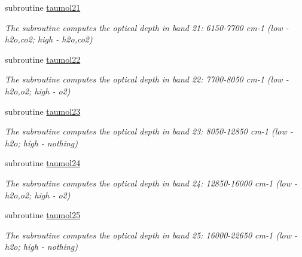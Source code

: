 \begin{DoxyCompactItemize}
\mbox{\label{radsw__main_8f_a54619c48147f35da2d7855dc488c0ff4}} 
subroutine \hyperlink{radsw__main_8f_a54619c48147f35da2d7855dc488c0ff4}{taumol21}
\begin{DoxyCompactList}\small\item\em The subroutine computes the optical depth in band 21\+: 6150-\/7700 cm-\/1 (low -\/ h2o,co2; high -\/ h2o,co2) \end{DoxyCompactList}\item 
\mbox{\label{radsw__main_8f_a3b5392346eee35eb13a2a54175b6338b}} 
subroutine \hyperlink{radsw__main_8f_a3b5392346eee35eb13a2a54175b6338b}{taumol22}
\begin{DoxyCompactList}\small\item\em The subroutine computes the optical depth in band 22\+: 7700-\/8050 cm-\/1 (low -\/ h2o,o2; high -\/ o2) \end{DoxyCompactList}\item 
\mbox{\label{radsw__main_8f_adf5d73763c80ec079b72dda7d74cba94}} 
subroutine \hyperlink{radsw__main_8f_adf5d73763c80ec079b72dda7d74cba94}{taumol23}
\begin{DoxyCompactList}\small\item\em The subroutine computes the optical depth in band 23\+: 8050-\/12850 cm-\/1 (low -\/ h2o; high -\/ nothing) \end{DoxyCompactList}\item 
\mbox{\label{radsw__main_8f_ae0abf1a08aa5d6ca14bfea83d0603716}} 
subroutine \hyperlink{radsw__main_8f_ae0abf1a08aa5d6ca14bfea83d0603716}{taumol24}
\begin{DoxyCompactList}\small\item\em The subroutine computes the optical depth in band 24\+: 12850-\/16000 cm-\/1 (low -\/ h2o,o2; high -\/ o2) \end{DoxyCompactList}\item 
\mbox{\label{radsw__main_8f_a21b72d6de9247eccb20de836ea76cf7a}} 
subroutine \hyperlink{radsw__main_8f_a21b72d6de9247eccb20de836ea76cf7a}{taumol25}
\begin{DoxyCompactList}\small\item\em The subroutine computes the optical depth in band 25\+: 16000-\/22650 cm-\/1 (low -\/ h2o; high -\/ nothing) \end{DoxyCompactList}\item 

\end{DoxyCompactItemize}
